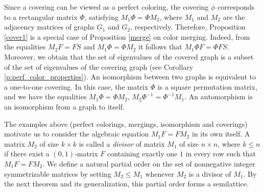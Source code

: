 \documentclass[11pt]{article}
\theoremstyle{definition}
\begin{document}
Since a covering can be viewed as a perfect coloring,
the covering $\phi$ corresponds to a rectangular matrix $\Phi$, satisfying $M_1\Phi=\Phi M_2$, where $M_1$ and $M_2$
are the adjacency matrices of graphs $G_1$ and $G_2$, respectively. Therefore, Proposition
\ref{cover1} is a special case of Proposition
\ref{merge} on color merging. Indeed, from the equalities $M_2F=FS$ and
$M_1\Phi=\Phi M_2$ it follows that $M_1\Phi F=\Phi FS$.  Moreover,
we obtain that the set of eigenvalues of the covered graph is a subset of the set of eigenvalues  of the covering graph (see Corollary  \ref{p:perf_color_properties}).
An isomorphism between two graphs is equivalent to a one-to-one covering. In
this case, the matrix $\Phi$ is a square permutation matrix, and we have the equalities $M_1\Phi=\Phi M_2$,
$M_2\Phi^{-1}=\Phi^{-1} M_1$. 
An automorphism is an isomorphism from a graph to itself. 

The examples above (perfect colorings, mergings, isomorphism and coverings) motivate us to consider the algebraic
equation $M_1F=FM_2$ in its own itself.
A matrix $M_2$  of size $k\times k$ is called a {\sl divisor} of matrix  $M_1$   of size $n\times n$, where $k\leq n$ if there exist   a $(0,1)$-matrix  $F$ containing exactly one $1$ in every row such that   $M_1F=FM_2$.
We define a natural partial order on the set of  nonnegative  integer symmetrizable matrices by setting $M_2\leq M_1$ whenever $M_2$ is a divisor of $M_1$. By the next theorem and its generalization,  this  partial order forms a semilattice.
\end{document}
